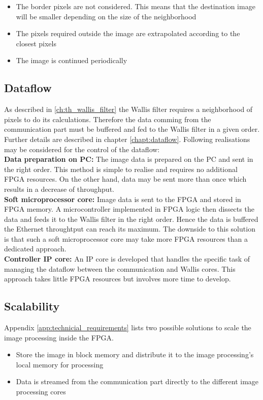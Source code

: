 \begin{itemize}
\item The border pixels are not considered. This means that the destination image will be smaller depending on the size of the neighborhood
\item The pixels required outside the image are extrapolated according to the closest pixels
\item The image is continued periodically
\end{itemize}

\subsection{Dataflow} \label{chapt:mission:dataflow}
As described in \ref{ch:th_wallis_filter} the Wallis filter requires a
neighborhood of pixels to do its calculations. Therefore the data comming from
the communication part must be buffered and fed to the Wallis filter in a given
order. Further details are described in chapter \ref{chapt:dataflow}. Following
realisations may be considered for the control of the dataflow:\\

\textbf{Data preparation on PC:} The image data is prepared on the PC and sent
in the right order. This method is simple to realise and requires no
additional FPGA resources. On the other hand, data may be sent more than once
which results in a decrease of throughput.\\

\textbf{Soft microprocessor core:} Image data is sent to the FPGA and stored in
FPGA memory. A microcontroller implemented in FPGA logic then dissects the data
and feeds it to the Wallis filter in the right order. Hence the data is buffered
the Ethernet throughtput can reach its maximum. The downside to this
solution
is that such a soft microprocessor core may take more FPGA resources than a
dedicated approach.\\

\textbf{Controller IP core:} An IP core is developed that handles the specific
task of managing the dataflow between the communication and Wallis cores. This
approach takes little FPGA resources but involves more time to develop.

\subsection{Scalability} \label{chapt:mission:scalability}
Appendix \ref{app:technicial_requirements} lists two possible solutions to scale
the image processing inside the FPGA. 
\begin{itemize}
    \item Store the image in block memory and distribute it to the image
    processing's local memory for processing
    \item Data is streamed from the communication part directly to the different
    image processing cores
\end{itemize}

